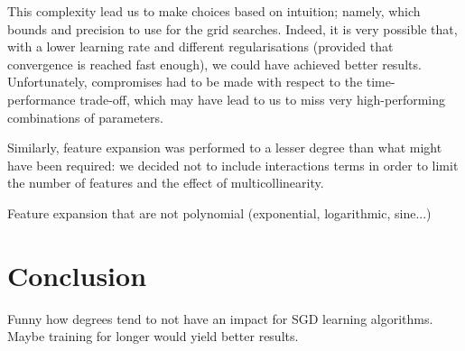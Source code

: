 \documentclass[10pt,conference,compsocconf]{IEEEtran}
\begin{document}
This complexity lead us to make choices based on intuition; namely,
which bounds and precision to use for the grid searches.
Indeed, it is very possible that, with a lower learning rate and
different regularisations (provided that convergence is reached fast
enough), we could have achieved better results.
Unfortunately, compromises had to be made with respect to the 
time-performance trade-off, which may have lead to us to
miss very high-performing combinations of parameters.

Similarly, feature expansion was performed to a lesser degree than
what might have been required: we decided not to include interactions
terms in order to limit the number of features and the effect of
multicollinearity.

Feature expansion that are not polynomial (exponential, logarithmic, sine...)

\section{Conclusion}
Funny how degrees tend to not have an impact for SGD learning algorithms.
Maybe training for longer would yield better results.




\end{document}
